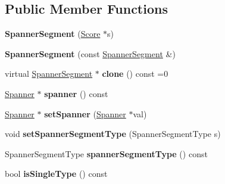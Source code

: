 \subsection*{Public Member Functions}
\begin{DoxyCompactItemize}
\item 
\mbox{\label{class_ms_1_1_spanner_segment_a36e358ec4e865f4eacf5f5bd64e56ab1}} 
{\bfseries Spanner\+Segment} (\hyperlink{class_ms_1_1_score}{Score} $\ast$s)
\item 
\mbox{\label{class_ms_1_1_spanner_segment_a61ef6d3bf64c8c4b4370c77616ac3b45}} 
{\bfseries Spanner\+Segment} (const \hyperlink{class_ms_1_1_spanner_segment}{Spanner\+Segment} \&)
\item 
\mbox{\label{class_ms_1_1_spanner_segment_ae55a8a09c2f2223747d08f7f40cac072}} 
virtual \hyperlink{class_ms_1_1_spanner_segment}{Spanner\+Segment} $\ast$ {\bfseries clone} () const =0
\item 
\mbox{\label{class_ms_1_1_spanner_segment_aef566e6223c15bad8cba7de7a9bc63dc}} 
\hyperlink{class_ms_1_1_spanner}{Spanner} $\ast$ {\bfseries spanner} () const
\item 
\mbox{\label{class_ms_1_1_spanner_segment_ad979b56052afbb657538e1daa804938a}} 
\hyperlink{class_ms_1_1_spanner}{Spanner} $\ast$ {\bfseries set\+Spanner} (\hyperlink{class_ms_1_1_spanner}{Spanner} $\ast$val)
\item 
\mbox{\label{class_ms_1_1_spanner_segment_aa8e443286d58d8d50a99cc891c61e72f}} 
void {\bfseries set\+Spanner\+Segment\+Type} (Spanner\+Segment\+Type s)
\item 
\mbox{\label{class_ms_1_1_spanner_segment_ab449736266b9d157ce4688e1ce42cdff}} 
Spanner\+Segment\+Type {\bfseries spanner\+Segment\+Type} () const
\item 
\mbox{\label{class_ms_1_1_spanner_segment_a4816b6d9d4d5e9eb461bf77548a12a0d}} 
bool {\bfseries is\+Single\+Type} () const
\item 
\mbox{\label{class_ms_1_1_spanner_segment_a00e08917a6f5b0eedd7d47c1d6d93c78}} 

\end{DoxyCompactItemize}
